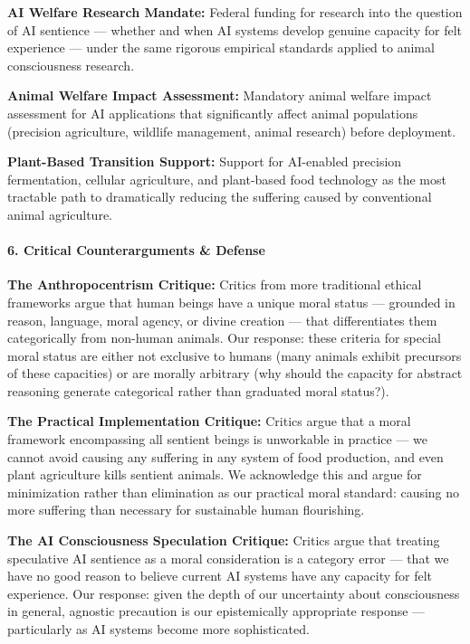 \textbf{AI Welfare Research Mandate:} Federal funding for research into
the question of AI sentience --- whether and when AI systems develop
genuine capacity for felt experience --- under the same rigorous
empirical standards applied to animal consciousness research.

\textbf{Animal Welfare Impact Assessment:} Mandatory animal welfare
impact assessment for AI applications that significantly affect animal
populations (precision agriculture, wildlife management, animal
research) before deployment.

\textbf{Plant-Based Transition Support:} Support for AI-enabled
precision fermentation, cellular agriculture, and plant-based food
technology as the most tractable path to dramatically reducing the
suffering caused by conventional animal agriculture.

\paragraph{6. Critical Counterarguments \&
Defense}\label{critical-counterarguments-defense-32}

\textbf{The Anthropocentrism Critique:} Critics from more traditional
ethical frameworks argue that human beings have a unique moral status
--- grounded in reason, language, moral agency, or divine creation ---
that differentiates them categorically from non-human animals. Our
response: these criteria for special moral status are either not
exclusive to humans (many animals exhibit precursors of these
capacities) or are morally arbitrary (why should the capacity for
abstract reasoning generate categorical rather than graduated moral
status?).

\textbf{The Practical Implementation Critique:} Critics argue that a
moral framework encompassing all sentient beings is unworkable in
practice --- we cannot avoid causing any suffering in any system of food
production, and even plant agriculture kills sentient animals. We
acknowledge this and argue for minimization rather than elimination as
our practical moral standard: causing no more suffering than necessary
for sustainable human flourishing.

\textbf{The AI Consciousness Speculation Critique:} Critics argue that
treating speculative AI sentience as a moral consideration is a category
error --- that we have no good reason to believe current AI systems have
any capacity for felt experience. Our response: given the depth of our
uncertainty about consciousness in general, agnostic precaution is our
epistemically appropriate response --- particularly as AI systems become
more sophisticated.

